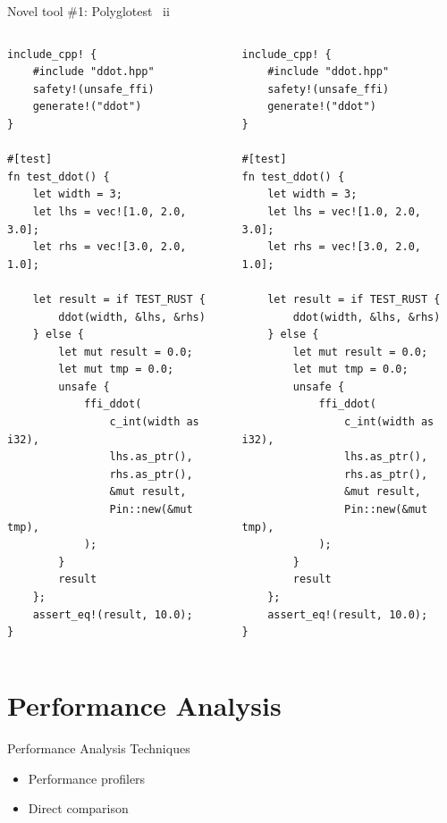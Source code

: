 \documentclass[10pt,aspectratio=169]{beamer}
\begin{document}
\begin{frame}[fragile]{Novel tool \#1: Polyglotest \ ii}
        \begin{columns}[T,onlytextwidth]
            \centering
            \begin{verbatim}
include_cpp! {
    #include "ddot.hpp"
    safety!(unsafe_ffi)
    generate!("ddot")
}

#[test]
fn test_ddot() {
    let width = 3;
    let lhs = vec![1.0, 2.0, 3.0];
    let rhs = vec![3.0, 2.0, 1.0];

    let result = if TEST_RUST {
        ddot(width, &lhs, &rhs)
    } else {
        let mut result = 0.0;
        let mut tmp = 0.0;
        unsafe {
            ffi_ddot(
                c_int(width as i32),
                lhs.as_ptr(),
                rhs.as_ptr(),
                &mut result,
                Pin::new(&mut tmp),
            );
        }
        result
    };
    assert_eq!(result, 10.0);
}
            \end{verbatim}
            \begin{verbatim}
include_cpp! {
    #include "ddot.hpp"
    safety!(unsafe_ffi)
    generate!("ddot")
}

#[test]
fn test_ddot() {
    let width = 3;
    let lhs = vec![1.0, 2.0, 3.0];
    let rhs = vec![3.0, 2.0, 1.0];

    let result = if TEST_RUST {
        ddot(width, &lhs, &rhs)
    } else {
        let mut result = 0.0;
        let mut tmp = 0.0;
        unsafe {
            ffi_ddot(
                c_int(width as i32),
                lhs.as_ptr(),
                rhs.as_ptr(),
                &mut result,
                Pin::new(&mut tmp),
            );
        }
        result
    };
    assert_eq!(result, 10.0);
}
            \end{verbatim}
        \end{columns}
\end{frame}




\section{Performance Analysis}
\begin{frame}{Performance Analysis Techniques}
    \begin{itemize}
        \item Performance profilers
        \item Direct comparison
    \end{itemize}
\end{frame}
\end{document}
